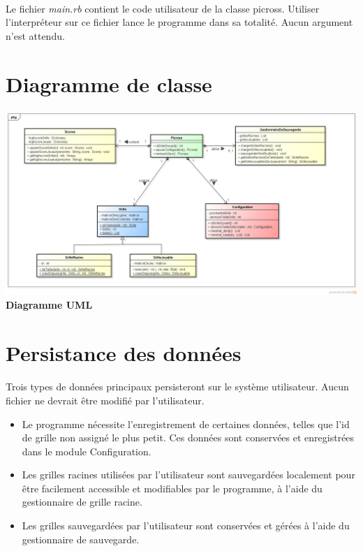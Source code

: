         \paragraph*{}
        Le fichier \textit{main.rb} contient le code utilisateur de la classe picross. Utiliser l'interpréteur sur ce fichier lance le programme dans  sa totalité.
	Aucun argument n'est attendu.

\section{Diagramme de classe}
        \paragraph*{}
 
 	\begin{center}
        	\includegraphics[scale=0.6]{data/UMLDiagram.png}\\
        	\textbf{Diagramme UML}
	\end{center}
\newpage 


\section{Persistance des données}
        \paragraph*{}
         Trois types de données principaux persisteront sur le système utilisateur. Aucun fichier ne devrait être modifié par l'utilisateur.
        \begin{itemize}
		\item Le programme nécessite l'enregistrement de certaines données, telles que l'id de grille non assigné le plus petit.
		Ces données sont conservées et enregistrées dans le module Configuration.
		\item Les grilles racines utilisées par l'utilisateur sont sauvegardées localement pour être facilement accessible 
		et modifiables par le programme, à l'aide du gestionnaire de grille racine.
		\item Les grilles sauvegardées par l'utilisateur sont conservées et gérées à l'aide du gestionnaire de sauvegarde.
        \end{itemize}



